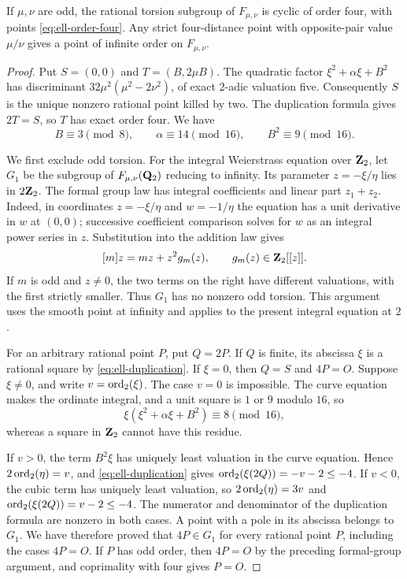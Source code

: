 \begin{theorem}
\label{thm:ell-torsion}
If $\mu,\nu$ are odd, the rational torsion subgroup of
$F_{\mu,\nu}$ is cyclic of order four, with points
\eqref{eq:ell-order-four}.  Any strict four-distance point with
opposite-pair value $\mu/\nu$ gives a point of infinite order on
$F_{\mu,\nu}$.
\end{theorem}
\begin{proof}
Put $S=(0,0)$ and $T=(B,2\mu B)$. The quadratic factor
$\xi^2+\alpha\xi+B^2$ has discriminant
$32\mu^2(\mu^2-2\nu^2)$, of exact $2$-adic valuation five.
Consequently $S$ is the unique nonzero rational point killed by two.
The duplication formula gives $2T=S$, so $T$ has exact order four.
We have
\[
 B\equiv3\pmod8,\qquad \alpha\equiv14\pmod{16},\qquad
 B^2\equiv9\pmod{16}.
\]

We first exclude odd torsion. For the integral Weierstrass equation over
$\mathbf Z_2$, let $G_1$ be the subgroup of $F_{\mu,\nu}(\mathbf Q_2)$ reducing
to infinity. Its parameter $z=-\xi/\eta$ lies in $2\mathbf Z_2$.
The formal group law has integral coefficients and linear part
$z_1+z_2$. Indeed, in coordinates $z=-\xi/\eta$ and $w=-1/\eta$
the equation has a unit derivative in $w$ at $(0,0)$; successive
coefficient comparison solves for $w$ as an integral power series in
$z$. Substitution into the addition law gives
\[
 [m]z=mz+z^2g_m(z),\qquad g_m(z)\in\mathbf Z_2[[z]].
\]
If $m$ is odd and $z\ne0$, the two terms on the right have different
valuations, with the first strictly smaller. Thus $G_1$ has no
nonzero odd torsion. This argument uses the smooth point at infinity
and applies to the present integral equation at $2$.

For an arbitrary rational point $P$, put $Q=2P$. If $Q$ is finite,
its abscissa $\xi$ is a rational square by
\eqref{eq:ell-duplication}. If $\xi=0$, then $Q=S$ and $4P=O$.
Suppose $\xi\ne0$, and write $v=\operatorname{ord}_2(\xi)$.
The case $v=0$ is impossible. The curve equation makes the ordinate
integral, and a unit square is $1$ or $9$ modulo $16$, so
\[
 \xi(\xi^2+\alpha\xi+B^2)\equiv8\pmod{16},
\]
whereas a square in $\mathbf Z_2$ cannot have this residue.

If $v>0$, the term $B^2\xi$ has uniquely least valuation in the
curve equation. Hence $2\operatorname{ord}_2(\eta)=v$, and
\eqref{eq:ell-duplication} gives
$\operatorname{ord}_2(\xi(2Q))=-v-2\le-4$.
If $v<0$, the cubic term has uniquely least valuation, so
$2\operatorname{ord}_2(\eta)=3v$ and
$\operatorname{ord}_2(\xi(2Q))=v-2\le-4$.
The numerator and denominator of the duplication formula are nonzero
in both cases. A point with a pole in its abscissa belongs to $G_1$.
We have therefore proved that $4P\in G_1$ for every rational point
$P$, including the cases $4P=O$.
If $P$ has odd order, then $4P=O$ by the preceding formal-group
argument, and coprimality with four gives $P=O$.


\end{proof}
